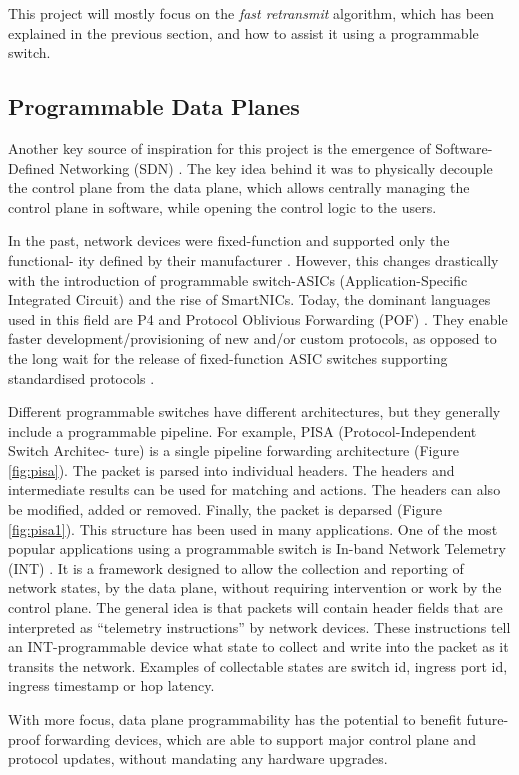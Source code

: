 This project will mostly focus on the \textit{fast retransmit} algorithm, which has been explained in the previous section, and how to assist it using a programmable switch.
\subsection{Programmable Data Planes}
Another key source of inspiration for this project is the emergence of Software-Defined Networking (SDN) \cite{sdn}. The key idea behind it was to physically decouple the control plane from the data plane, which allows centrally managing the control plane in software, while opening the control logic to the users.

In the past, network devices were fixed-function and supported only the functional- ity defined by their manufacturer \cite{sdn}. However, this changes drastically with the introduction of programmable switch-ASICs (Application-Specific Integrated Circuit) \cite{asic} and the rise of SmartNICs. Today, the dominant languages used in this field are P4 \cite{bosshart2014p4, p4spec, p4.org} and Protocol Oblivious Forwarding (POF) \cite{pof, song2013protocol}. They enable faster development/provisioning of new and/or custom protocols, as opposed to the long wait for the release of fixed-function ASIC switches supporting standardised protocols \cite{sivaraman2015dc}.

Different programmable switches have different architectures, but they generally include a programmable pipeline. For example, PISA (Protocol-Independent Switch Architec- ture) is a single pipeline forwarding architecture (Figure \ref{fig:pisa}). The packet is parsed into individual headers. The headers and intermediate results can be used for matching and actions. The headers can also be modified, added or removed. Finally, the packet is deparsed (Figure \ref{fig:pisa1}). This structure has been used in many applications. One of the most popular applications using a programmable switch is In-band Network Telemetry (INT) \cite{int}. It is a framework designed to allow the collection and reporting of network states, by the data plane, without requiring intervention or work by the control plane. The general idea is that packets will contain header fields that are interpreted as “telemetry instructions” by network devices. These instructions tell an INT-programmable device what state to collect and write into the packet as it transits the network. Examples of collectable states are switch id, ingress port id, ingress timestamp or hop latency.

With more focus, data plane programmability has the potential to benefit future-proof forwarding devices, which are able to support major control plane and protocol updates, without mandating any hardware upgrades.
